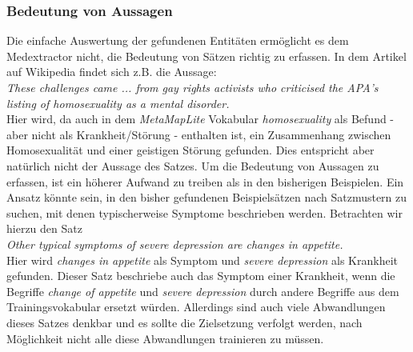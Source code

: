 \subsubsection{Bedeutung von Aussagen}
\label{subsec: bedeutung} 

Die einfache Auswertung der gefundenen Entitäten ermöglicht es dem Medextractor nicht, die Bedeutung von Sätzen richtig zu erfassen. In dem Artikel auf Wikipedia findet sich z.B. die Aussage:\\

\emph{\glqq These challenges came ... from gay rights activists who criticised the APA's listing of homosexuality as a mental disorder.\grqq}\\

Hier wird, da auch in dem \emph{MetaMapLite} Vokabular \emph{homosexuality} als Befund - aber nicht als Krankheit/Störung - enthalten ist, ein Zusammenhang zwischen Homosexualität und einer geistigen Störung gefunden. Dies entspricht aber natürlich nicht der Aussage des Satzes. Um die Bedeutung von Aussagen zu erfassen, ist ein höherer Aufwand zu treiben als in den bisherigen Beispielen. Ein Ansatz könnte sein, in den bisher gefundenen Beispielsätzen nach Satzmustern zu suchen, mit denen typischerweise Symptome beschrieben werden. Betrachten wir hierzu den Satz\\

\emph{\glqq Other typical symptoms of severe depression are changes in appetite.\grqq}\\

Hier wird \emph{changes in appetite} als Symptom und \emph{severe depression} als Krankheit gefunden. Dieser Satz beschriebe auch das Symptom einer Krankheit, wenn die Begriffe \emph{change of appetite} und \emph{severe depression} durch andere Begriffe aus dem Trainingsvokabular ersetzt würden. Allerdings sind auch viele Abwandlungen dieses Satzes denkbar und es sollte die Zielsetzung verfolgt werden, nach Möglichkeit nicht alle diese Abwandlungen trainieren zu müssen.


